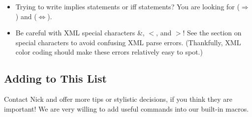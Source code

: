 {\begin{itemize}
      The matching command  can be used with the pipe character $|$ to produce effective set builder notation (and that's exactly how  does it!)
      \item Trying to write implies statements or iff statements? You are looking for  ($\Rightarrow$) and  ($\Leftrightarrow$).
      \item Be careful with XML special characters \&, $<$, and $>$! See the section on special characters to avoid confusing XML parse errors. (Thankfully, XML color coding should make these errors relatively easy to spot.)
    \end{itemize}
    
  \subsection{Adding to This List}
    Contact Nick and offer more tips or stylistic decisions, if you think they are important! We are very willing to add useful commands into our built-in macros.
  
  
}
  
  
  